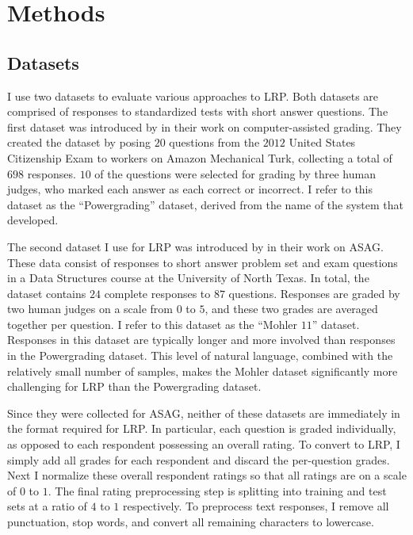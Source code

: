\section{Methods}
\subsection{Datasets}
I use two datasets to evaluate various approaches to LRP. Both datasets are comprised of responses to standardized tests with short answer questions. The first dataset was introduced by \citet{basu2013powergrading} in their work on computer-assisted grading. They created the dataset by posing $20$ questions from the $2012$ United States Citizenship Exam to workers on Amazon Mechanical Turk, collecting a total of $698$ responses. $10$ of the questions were selected for grading by three human judges, who marked each answer as each correct or incorrect. I refer to this dataset as the ``Powergrading'' dataset, derived from the name of the system that  \citet{basu2013powergrading} developed.

The second dataset I use for LRP was introduced by \citet{mohler2011learning} in their work on ASAG. These data consist of responses to short answer problem set and exam questions in a Data Structures course at the University of North Texas. In total, the dataset contains $24$ complete responses to $87$ questions. Responses are graded by two human judges on a scale from $0$ to $5$, and these two grades are averaged together per question. I refer to this dataset as the ``Mohler $11$'' dataset. Responses in this dataset are typically longer and more involved than responses in the Powergrading dataset. This level of natural language, combined with the relatively small number of samples, makes the Mohler dataset significantly more challenging for LRP than the Powergrading dataset.

Since they were collected for ASAG, neither of these datasets are immediately in the format required for LRP. In particular, each question is graded individually, as opposed to each respondent possessing an overall rating. To convert to LRP, I simply add all grades for each respondent and discard the per-question grades. Next I normalize these overall respondent ratings so that all ratings are on a scale of $0$ to $1$. The final rating preprocessing step is splitting into training and test sets at a ratio of $4$ to $1$ respectively. To preprocess text responses, I remove all punctuation, stop words, and convert all remaining characters to lowercase.

